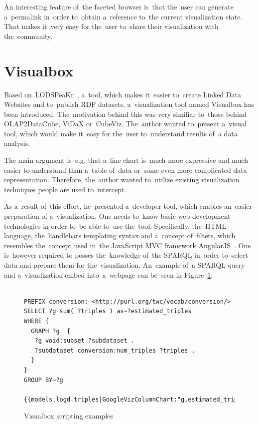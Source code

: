 An interesting feature of~the faceted browser is~that the~user can 
generate a~permalink in~order to~obtain a~reference to~the current visualization 
state. That makes it~very easy for the~user to~share their visualization with the~community.

\section{Visualbox}
Based on~LODSPeaKr~\cite{lodspeakr}, a~tool, which makes it~easier to~create Linked Data Websites 
and to~publish RDF datasets, a~visualization tool named Visualbox has been 
introduced. The~motivation behind this was very similiar to~those behind 
OLAP2DataCube, ViDaX or~CubeViz. The~author wanted to~present a~visual tool,
which would 
make it~easy for the~user to~understand results of~a data analysis.

The main argument is~e.g. that a~line chart is~much more expressive and much easier
to understand than a~table of~data or~some even more complicated data 
representation. Therefore, the~author wanted to~utilize existing visualization 
techniques people are used to~intercept.

As a~result of~this effort, he~presented a~developer tool, which enables an~easier preparation
of a~visualization. One needs to~know basic web development technologies 
in order to~be able to~use the~tool. Specifically, the~HTML language, the~handlebars templating syntax and a~concept of~filters, which resembles the~concept used in~the JavaScript MVC framework AngularJS~\cite{angularjs}. One is~however required
to posses the~knowledge of~the SPARQL in~order to~select data and prepare them for the~visualization. An~example of~a SPARQL query and a~visualization embed into~a~webpage can be~seen
in Figure~\ref{visualbox-example}.

\begin{figure}
\scriptsize\begin{verbatim}

PREFIX conversion: <http://purl.org/twc/vocab/conversion/>
SELECT ?g sum( ?triples ) as~?estimated_triples
WHERE {
  GRAPH ?g  {
   ?g void:subset ?subdataset .
   ?subdataset conversion:num_triples ?triples .
  }
} 
GROUP BY~?g

{{models.logd.triples|GoogleVizColumnChart:"g,estimated_triples,width=1200"}}
\end{verbatim}\normalsize
\caption{Visualbox scripting examples}
\label{visualbox-example}
\end{figure}

